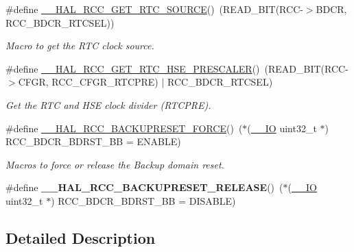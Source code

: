 \begin{DoxyCompactItemize}
\#define \hyperlink{group___r_c_c___internal___r_t_c___clock___configuration_gad40d00ff1c984ebd011ea9f6e7f93c44}{\+\_\+\+\_\+\+H\+A\+L\+\_\+\+R\+C\+C\+\_\+\+G\+E\+T\+\_\+\+R\+T\+C\+\_\+\+S\+O\+U\+R\+CE}()~(R\+E\+A\+D\+\_\+\+B\+IT(R\+CC-\/$>$B\+D\+CR, R\+C\+C\+\_\+\+B\+D\+C\+R\+\_\+\+R\+T\+C\+S\+EL))
\begin{DoxyCompactList}\small\item\em Macro to get the R\+TC clock source. \end{DoxyCompactList}\item 
\#define \hyperlink{group___r_c_c___internal___r_t_c___clock___configuration_ga85dc62f0fcb14981c47d7f7da25e26d6}{\+\_\+\+\_\+\+H\+A\+L\+\_\+\+R\+C\+C\+\_\+\+G\+E\+T\+\_\+\+R\+T\+C\+\_\+\+H\+S\+E\+\_\+\+P\+R\+E\+S\+C\+A\+L\+ER}()~(R\+E\+A\+D\+\_\+\+B\+IT(R\+CC-\/$>$C\+F\+GR, R\+C\+C\+\_\+\+C\+F\+G\+R\+\_\+\+R\+T\+C\+P\+RE) $\vert$ R\+C\+C\+\_\+\+B\+D\+C\+R\+\_\+\+R\+T\+C\+S\+EL)
\begin{DoxyCompactList}\small\item\em Get the R\+TC and H\+SE clock divider (R\+T\+C\+P\+RE). \end{DoxyCompactList}\item 
\#define \hyperlink{group___r_c_c___internal___r_t_c___clock___configuration_ga3bf7da608ff985873ca8e248fb1dc4f0}{\+\_\+\+\_\+\+H\+A\+L\+\_\+\+R\+C\+C\+\_\+\+B\+A\+C\+K\+U\+P\+R\+E\+S\+E\+T\+\_\+\+F\+O\+R\+CE}()~($\ast$(\hyperlink{core__sc300_8h_aec43007d9998a0a0e01faede4133d6be}{\+\_\+\+\_\+\+IO} uint32\+\_\+t $\ast$) R\+C\+C\+\_\+\+B\+D\+C\+R\+\_\+\+B\+D\+R\+S\+T\+\_\+\+BB = E\+N\+A\+B\+LE)
\begin{DoxyCompactList}\small\item\em Macros to force or release the Backup domain reset. \end{DoxyCompactList}\item 
\mbox{\label{group___r_c_c___internal___r_t_c___clock___configuration_ga14f32622c65f4ae239ba8cb00d510321}} 
\#define {\bfseries \+\_\+\+\_\+\+H\+A\+L\+\_\+\+R\+C\+C\+\_\+\+B\+A\+C\+K\+U\+P\+R\+E\+S\+E\+T\+\_\+\+R\+E\+L\+E\+A\+SE}()~($\ast$(\hyperlink{core__sc300_8h_aec43007d9998a0a0e01faede4133d6be}{\+\_\+\+\_\+\+IO} uint32\+\_\+t $\ast$) R\+C\+C\+\_\+\+B\+D\+C\+R\+\_\+\+B\+D\+R\+S\+T\+\_\+\+BB = D\+I\+S\+A\+B\+LE)
\end{DoxyCompactItemize}


\subsection{Detailed Description}


